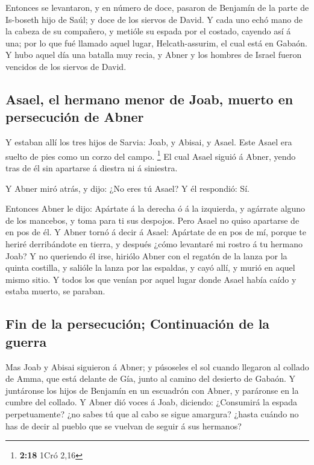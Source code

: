  Entonces se levantaron, y en número de doce, pasaron de
Benjamín de la parte de Is-boseth hijo de Saúl; y doce de los siervos de
David.  Y cada uno echó mano de la cabeza de su compañero,
y metióle su espada por el costado, cayendo así á una; por lo que fué
llamado aquel lugar, Helcath-assurim, el cual está en Gabaón.
 Y hubo aquel día una batalla muy recia, y Abner y los
hombres de Israel fueron vencidos de los siervos de David.

\hypertarget{asael-el-hermano-menor-de-joab-muerto-en-persecuciuxf3n-de-abner}{%
\subsection{Asael, el hermano menor de Joab, muerto en persecución de
Abner}\label{asael-el-hermano-menor-de-joab-muerto-en-persecuciuxf3n-de-abner}}

 Y estaban allí los tres hijos de Sarvia: Joab, y Abisai, y
Asael. Este Asael era suelto de pies como un corzo del campo.
\footnote{\textbf{2:18} 1Cró 2,16}  El cual Asael siguió á
Abner, yendo tras de él sin apartarse á diestra ni á siniestra.

 Y Abner miró atrás, y dijo: ¿No eres tú Asael? Y él
respondió: Sí.

 Entonces Abner le dijo: Apártate á la derecha ó á la
izquierda, y agárrate alguno de los mancebos, y toma para ti sus
despojos. Pero Asael no quiso apartarse de en pos de él.  Y
Abner tornó á decir á Asael: Apártate de en pos de mí, porque te heriré
derribándote en tierra, y después ¿cómo levantaré mi rostro á tu hermano
Joab?  Y no queriendo él irse, hiriólo Abner con el regatón
de la lanza por la quinta costilla, y salióle la lanza por las espaldas,
y cayó allí, y murió en aquel mismo sitio. Y todos los que venían por
aquel lugar donde Asael había caído y estaba muerto, se paraban.

\hypertarget{fin-de-la-persecuciuxf3n-continuaciuxf3n-de-la-guerra}{%
\subsection{Fin de la persecución; Continuación de la
guerra}\label{fin-de-la-persecuciuxf3n-continuaciuxf3n-de-la-guerra}}

 Mas Joab y Abisai siguieron á Abner; y púsoseles el sol
cuando llegaron al collado de Amma, que está delante de Gía, junto al
camino del desierto de Gabaón.  Y juntáronse los hijos de
Benjamín en un escuadrón con Abner, y paráronse en la cumbre del
collado.  Y Abner dió voces á Joab, diciendo: ¿Consumirá la
espada perpetuamente? ¿no sabes tú que al cabo se sigue amargura? ¿hasta
cuándo no has de decir al pueblo que se vuelvan de seguir á sus
hermanos?

